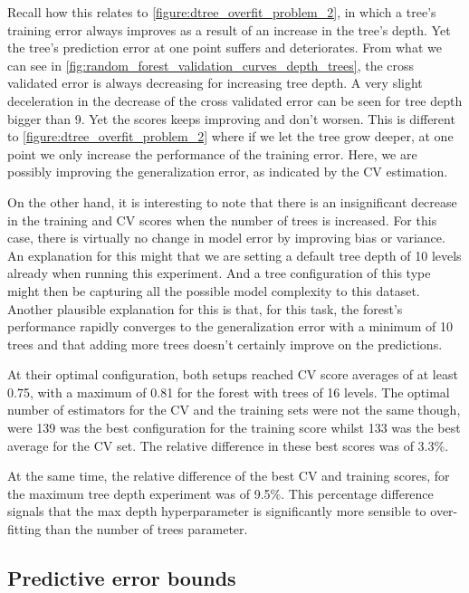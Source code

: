 Recall how this relates to \cref{figure:dtree_overfit_problem_2}, in which a tree's training error always improves as a result of an increase in the tree's depth.
Yet the tree's prediction error at one point suffers and deteriorates.
From what we can see in \cref{fig:random_forest_validation_curves_depth_trees}, the cross validated error is always decreasing for increasing tree depth.
A very slight deceleration in the decrease of the cross validated error can be seen for tree depth bigger than 9.
Yet the scores keeps improving and don't worsen.
This is different to \cref{figure:dtree_overfit_problem_2} where if we let the tree grow deeper, at one point we only increase the performance of the training error.
Here, we are possibly improving the generalization error, as indicated by the CV estimation.

 On the other hand, it is interesting to note that there is an insignificant decrease in the training and CV scores when the number of trees is increased.
For this case, there is virtually no change in model error by improving bias or variance.
 An explanation for this might that we are setting a default tree depth of 10 levels already when running this experiment. And a tree configuration of this type might then be capturing all the possible model complexity to this dataset.
 Another plausible explanation for this is that, for this task, the forest's performance rapidly converges to the generalization error with a minimum of 10 trees and that adding more trees doesn't certainly improve on the predictions.


At their optimal configuration, both setups reached CV score averages of at least 0.75, with a maximum of 0.81 for the forest
with trees of 16 levels.
The optimal number of estimators for the CV and the training sets were not the same though, were 139 was the best configuration for the training score whilst 133 was the best average for the CV set.
The relative difference in these best scores was of 3.3\%.

At the same time, the relative difference of the best CV and training scores, for the maximum tree depth experiment was of 9.5\%.
This percentage difference signals that the max depth hyperparameter is significantly more sensible to over-fitting than the number of trees parameter.


\subsection{Predictive error bounds}

